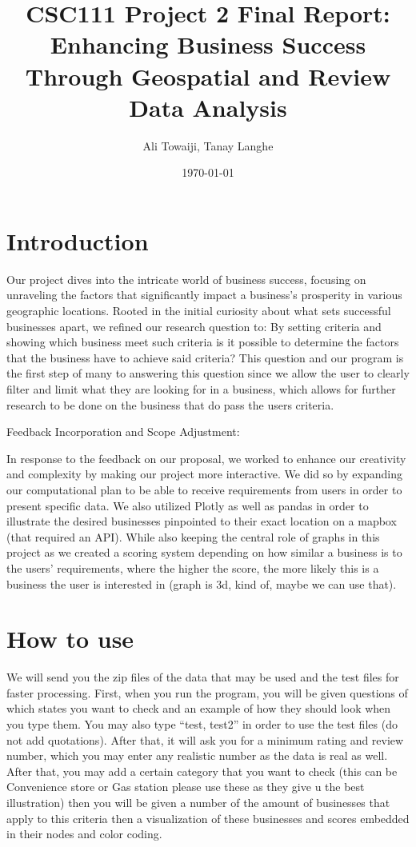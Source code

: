 \documentclass[fontsize=11pt]{article}
\title{CSC111 Project 2 Final Report: Enhancing Business Success Through Geospatial and Review Data Analysis}
\author{Ali Towaiji, Tanay Langhe}
\date{\today}
\begin{document}
\maketitle

\section*{Introduction}

Our project dives into the intricate world of business success, focusing on unraveling the factors that significantly impact a business's prosperity in various geographic locations. Rooted in the initial curiosity about what sets successful businesses apart, we refined our research question to: By setting criteria and showing which business meet such criteria is it possible to determine the factors that the business have to achieve said criteria? This question and our program is the first step of many to answering this question since we allow the user to clearly filter and limit what they are looking for in a business, which allows for further research to be done on the business that do pass the users criteria.

Feedback Incorporation and Scope Adjustment:

In response to the feedback on our proposal, we worked to enhance our creativity and complexity by making our project more interactive. We did so by expanding our computational plan to be able to receive requirements from users in order to present specific data. We also utilized Plotly as well as pandas in order to illustrate the desired businesses pinpointed to their exact location on a mapbox (that required an API). While also keeping the central role of graphs in this project as we created a scoring system depending on how similar a business is to the users' requirements, where the higher the score, the more likely this is a business the user is interested in (graph is 3d, kind of, maybe we can use that).

\section*{How to use}

We will send you the zip files of the data that may be used and the test files for faster processing. First, when you run the program, you will be given questions of which states you want to check and an example of how they should look when you type them. You may also type ``test, test2'' in order to use the test files (do not add quotations). After that, it will ask you for a minimum rating and review number, which you may enter any realistic number as the data is real as well. After that, you may add a certain category that you want to check (this can be Convenience store or Gas station please use these as they give u the best illustration) then you will be given a number of the amount of businesses that apply to this criteria then a visualization of these businesses and scores embedded in their nodes and color coding.
\end{document}
